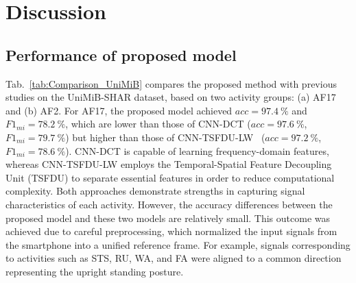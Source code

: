 \documentclass[journal,twoside,web]{ieeecolor}
\begin{document}
\section{Discussion}

\subsection{Performance of proposed model}

\begin{table}[h!]
\caption{Comparison of recognition performance on the UniMiB-SHAR dataset.}
\label{tab:Comparison_UniMiB}
\centering
 \footnotesize
\renewcommand{\arraystretch}{1.2} %
\end{table}

Tab.~\ref{tab:Comparison_UniMiB} compares the proposed method with previous studies on the UniMiB-SHAR dataset, based on two activity groups: (a) AF17 and (b) AF2. For AF17, the proposed model achieved $acc=97.4~\%$ and $F1_{mi}=78.2~\%$, which are lower than those of CNN-DCT \cite{HAR_DCT_deeplearning2023} ($acc=97.6~\%$, $F1_{mi}=79.7~\%$) but higher than those of CNN-TSFDU-LW~\cite{HAR_CNN_2025} ($acc=97.2~\%$, $F1_{mi}=78.6~\%$). CNN-DCT is capable of learning frequency-domain features, whereas CNN-TSFDU-LW employs the Temporal-Spatial Feature Decoupling Unit (TSFDU) to separate essential features in order to reduce computational complexity. Both approaches demonstrate strengths in capturing signal characteristics of each activity. However, the accuracy differences between the proposed model and these two models are relatively small. This outcome was achieved due to careful preprocessing, which normalized the input signals from the smartphone into a unified reference frame. For example, signals corresponding to activities such as STS, RU, WA, and FA were aligned to a common direction representing the upright standing posture.
\end{document}
